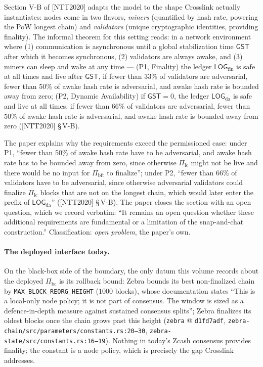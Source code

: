 \documentclass[11pt,a4paper]{article}
\theoremstyle{definition}
\begin{document}
Section V-B of [NTT2020] adapts the model to the shape Crosslink actually
instantiates: nodes come in two flavors, \emph{miners} (quantified by hash
rate, powering the PoW longest chain) and \emph{validators} (unique
cryptographic identities, providing finality). The informal theorem for
this setting reads: in a network environment where (1) communication is
asynchronous until a global stabilization time $\mathsf{GST}$ after which
it becomes synchronous, (2) validators are always awake, and (3) miners
can sleep and wake at any time --- (P1, Finality) the ledger
$\mathsf{LOG}_{\mathrm{fin}}$ is safe at all times and live after
$\mathsf{GST}$, if fewer than 33\% of validators are adversarial, fewer
than 50\% of awake hash rate is adversarial, and awake hash rate is
bounded away from zero; (P2, Dynamic Availability) if $\mathsf{GST} = 0$,
the ledger $\mathsf{LOG}_{\mathrm{da}}$ is safe and live at all times, if
fewer than 66\% of validators are adversarial, fewer than 50\% of awake
hash rate is adversarial, and awake hash rate is bounded away from zero
([NTT2020] \S\,V-B).

The paper explains why the requirements exceed the permissioned case:
under P1, ``fewer than 50\% of awake hash rate have to be adversarial, and
awake hash rate has to be bounded away from zero, since otherwise
$\Pi_{\mathrm{lc}}$ might not be live and there would be no input for
$\Pi_{\mathrm{bft}}$ to finalize''; under P2, ``fewer than 66\% of
validators have to be adversarial, since otherwise adversarial validators
could finalize $\Pi_{\mathrm{lc}}$ blocks that are not on the longest
chain, which would later enter the prefix of
$\mathsf{LOG}_{\mathrm{da}}$'' ([NTT2020] \S\,V-B). The paper closes the
section with an open question, which we record verbatim: ``It remains an
open question whether these additional requirements are fundamental or a
limitation of the snap-and-chat construction.'' Classification: \emph{open
problem}, the paper's own.

\paragraph{The deployed interface today.} On the black-box side of the
boundary, the only datum this volume records about the deployed
$\Pi_{\mathrm{bc}}$ is its rollback bound: Zebra bounds its best
non-finalized chain by \texttt{MAX\_BLOCK\_REORG\_HEIGHT} ($1000$ blocks),
whose documentation states ``This is a local-only node policy; it is not
part of consensus. The window is sized as a defence-in-depth measure
against sustained consensus splits''; Zebra finalizes its oldest blocks
once the chain grows past this height (\texttt{zebra} @ \texttt{d1fd7adf},
\texttt{zebra-chain/src/parameters/constants.rs:20--30},
\texttt{zebra-state/src/constants.rs:16--19}). Nothing in today's Zcash
consensus provides finality; the constant is a node policy, which is
precisely the gap Crosslink addresses.
\end{document}

